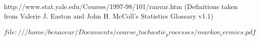 \documentclass[12pt,a4paper]{article}
\begin{document}
   
  
  
  http://www.stat.yale.edu/Courses/1997-98/101/ranvar.htm
  (Definitions taken from Valerie J. Easton and John H. McColl's Statistics Glossary v1.1) 
  
  
  $file:///home/benaceur/Documents/course_stochastic_processes/markov_cermics.pdf$
  
\end{document}
